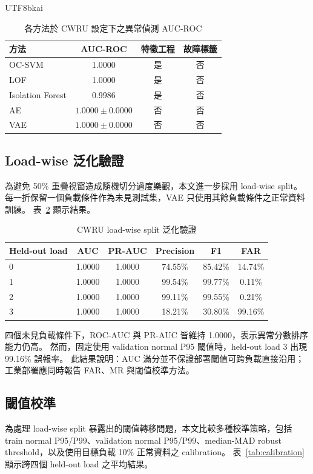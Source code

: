 \documentclass[conference]{IEEEtran}
\begin{document}
\begin{CJK}{UTF8}{bkai}
\begin{table}[ht]
\centering
\caption{各方法於 CWRU 設定下之異常偵測 AUC-ROC}
\label{tab:baseline}
\begin{tabular}{lccc}
\toprule
\textbf{方法} & \textbf{AUC-ROC} & \textbf{特徵工程} & \textbf{故障標籤} \\
\midrule
OC-SVM\cite{scholkopf2001} & 1.0000 & 是 & 否 \\
LOF\cite{breunig2000lof} & 1.0000 & 是 & 否 \\
Isolation Forest\cite{liu2008isolation} & 0.9986 & 是 & 否 \\
AE & $1.0000\pm0.0000$ & 否 & 否 \\
VAE & $1.0000\pm0.0000$ & 否 & 否 \\
\bottomrule
\end{tabular}
\end{table}

\subsection{Load-wise 泛化驗證}
為避免 50\% 重疊視窗造成隨機切分過度樂觀，本文進一步採用 load-wise split。
每一折保留一個負載條件作為未見測試集，VAE 只使用其餘負載條件之正常資料訓練。
表~\ref{tab:loadwise} 顯示結果。

\begin{table}[ht]
\centering
\caption{CWRU load-wise split 泛化驗證}
\label{tab:loadwise}
\begin{tabular}{lccccc}
\toprule
\textbf{Held-out load} & \textbf{AUC} & \textbf{PR-AUC} & \textbf{Precision} & \textbf{F1} & \textbf{FAR} \\
\midrule
0 & 1.0000 & 1.0000 & 74.55\% & 85.42\% & 14.74\% \\
1 & 1.0000 & 1.0000 & 99.54\% & 99.77\% & 0.11\% \\
2 & 1.0000 & 1.0000 & 99.11\% & 99.55\% & 0.21\% \\
3 & 1.0000 & 1.0000 & 18.21\% & 30.80\% & 99.16\% \\
\bottomrule
\end{tabular}
\end{table}

四個未見負載條件下，ROC-AUC 與 PR-AUC 皆維持 1.0000，表示異常分數排序能力仍高。
然而，固定使用 validation normal P95 閾值時，held-out load 3 出現 99.16\% 誤報率。
此結果說明：AUC 滿分並不保證部署閾值可跨負載直接沿用；工業部署應同時報告 FAR、MR 與閾值校準方法。

\subsection{閾值校準}
為處理 load-wise split 暴露出的閾值轉移問題，本文比較多種校準策略，包括 train normal P95/P99、validation normal P95/P99、median-MAD robust threshold，以及使用目標負載 10\% 正常資料之 calibration。
表~\ref{tab:calibration} 顯示跨四個 held-out load 之平均結果。


\end{CJK}
\end{document}
